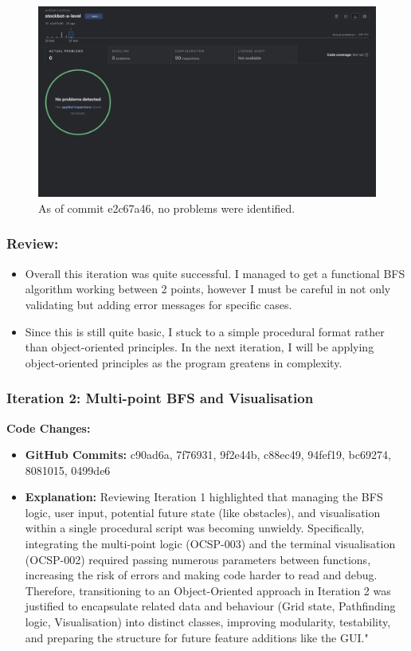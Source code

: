 \begin{figure}[htbp!]
    \centering
    \includegraphics[width=1\linewidth]{Images/qodana-sai1.png}
    \caption{As of commit e2c67a46, no problems were identified.}
\end{figure}

\subsubsection{Review:}
\begin{itemize}
    \item Overall this iteration was quite successful. I managed to get a functional BFS algorithm working between 2 points, however I must be careful in not only validating but adding error messages for specific cases.
    \item Since this is still quite basic, I stuck to a simple procedural format rather than object-oriented principles. In the next iteration, I will be applying object-oriented principles as the program greatens in complexity.
\end{itemize}



\newpage

\subsubsection{Iteration 2: Multi-point BFS and Visualisation}

\textbf{Code Changes:}
\begin{itemize}
    \item \textbf{GitHub Commits:} c90ad6a, 7f76931, 9f2e44b, c88ec49, 94fef19, bc69274, 8081015, 0499de6
    \item \textbf{Explanation:}
    Reviewing Iteration 1 highlighted that managing the BFS logic, user input, potential future state (like obstacles), and visualisation within a single procedural script was becoming unwieldy. Specifically, integrating the multi-point logic (OCSP-003)  and the terminal visualisation (OCSP-002)  required passing numerous parameters between functions, increasing the risk of errors and making code harder to read and debug. Therefore, transitioning to an Object-Oriented approach in Iteration 2 was justified to encapsulate related data and behaviour (Grid state, Pathfinding logic, Visualisation) into distinct classes, improving modularity, testability, and preparing the structure for future feature additions like the GUI."
\end{itemize}

